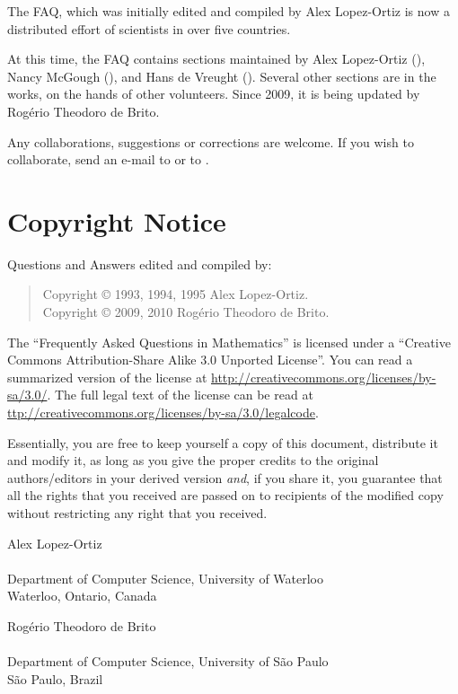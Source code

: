 The \scimath FAQ, which was initially edited and compiled by Alex
Lopez-Ortiz is now a distributed effort of scientists in over five
countries.

At this time, the FAQ contains sections maintained by Alex Lopez-Ortiz
(\emailalopez), Nancy McGough (\emailnancy), and Hans de Vreught
(\emailhans).  Several other sections are in the works, on the hands of
other volunteers. Since 2009, it is being updated by Rogério Theodoro de
Brito.

Any collaborations, suggestions or corrections are welcome. If you wish
to collaborate, send an e-mail to \emailrbrito or to \emailalopez.

\section{Copyright Notice}

Questions and Answers edited and compiled by:

\begin{verse}
  Copyright © 1993, 1994, 1995 Alex Lopez-Ortiz.\\
  Copyright © 2009, 2010 Rogério Theodoro de Brito.
\end{verse}

The \scimath ``Frequently Asked Questions in Mathematics'' is licensed
under a ``Creative Commons Attribution-Share Alike 3.0 Unported
License''.  You can read a summarized version of the license at
\url{http://creativecommons.org/licenses/by-sa/3.0/}.  The full legal
text of the license can be read at
\url{ttp://creativecommons.org/licenses/by-sa/3.0/legalcode}.

Essentially, you are free to keep yourself a copy of this document,
distribute it and modify it, as long as you give the proper credits to
the original authors/editors in your derived version \emph{and}, if you
share it, you guarantee that all the rights that you received are passed
on to recipients of the modified copy without restricting any right that
you received.

\bigskip

\noindent
Alex Lopez-Ortiz\\
\emailalopez\\
Department of Computer Science, University of Waterloo\\
Waterloo, Ontario, Canada

\medskip

\noindent
Rogério Theodoro de Brito\\
\emailrbrito\\
Department of Computer Science, University of São Paulo\\
São Paulo, Brazil
